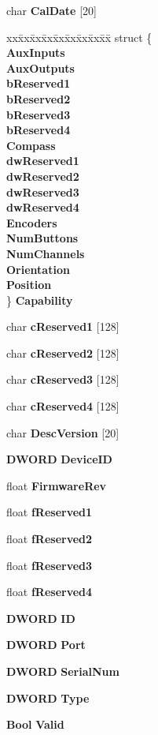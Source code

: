 \begin{DoxyCompactItemize}
\item 
char {\bf \-Cal\-Date} [20]
\item 
\begin{tabbing}
xx\=xx\=xx\=xx\=xx\=xx\=xx\=xx\=xx\=\kill
struct \{\\
 {\bf AuxInputs}\\
 {\bf AuxOutputs}\\
 {\bf bReserved1}\\
 {\bf bReserved2}\\
 {\bf bReserved3}\\
 {\bf bReserved4}\\
 {\bf Compass}\\
 {\bf dwReserved1}\\
 {\bf dwReserved2}\\
 {\bf dwReserved3}\\
 {\bf dwReserved4}\\
 {\bf Encoders}\\
 {\bf NumButtons}\\
 {\bf NumChannels}\\
 {\bf Orientation}\\
 {\bf Position}\\
\} {\bf Capability}\\

\end{tabbing}\item 
char {\bf c\-Reserved1} [128]
\item 
char {\bf c\-Reserved2} [128]
\item 
char {\bf c\-Reserved3} [128]
\item 
char {\bf c\-Reserved4} [128]
\item 
char {\bf \-Desc\-Version} [20]
\item 
{\bf \-D\-W\-O\-R\-D} {\bf \-Device\-I\-D}
\item 
float {\bf \-Firmware\-Rev}
\item 
float {\bf f\-Reserved1}
\item 
float {\bf f\-Reserved2}
\item 
float {\bf f\-Reserved3}
\item 
float {\bf f\-Reserved4}
\item 
{\bf \-D\-W\-O\-R\-D} {\bf \-I\-D}
\item 
{\bf \-D\-W\-O\-R\-D} {\bf \-Port}
\item 
{\bf \-D\-W\-O\-R\-D} {\bf \-Serial\-Num}
\item 
{\bf \-D\-W\-O\-R\-D} {\bf \-Type}
\item 
{\bf \-Bool} {\bf \-Valid}
\end{DoxyCompactItemize}


